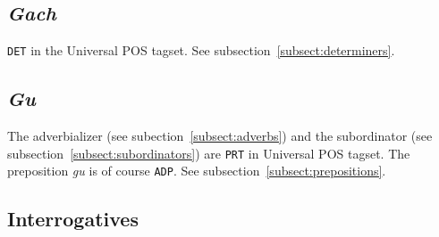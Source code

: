 \documentclass[a4paper]{article}
\begin{document}
\subsection{\textit{Gach}\label{subsect:gach}}

\texttt{DET} in the Universal POS tagset.
See subsection~\ref{subsect:determiners}.

\subsection{\textit{Gu}\label{subsect:gu}}

The adverbializer (see subection~\ref{subsect:adverbs}) and the subordinator (see subsection~\ref{subsect:subordinators}) are \texttt{PRT} in Universal POS tagset.
The preposition \textit{gu} is of course \texttt{ADP}.
See subsection~\ref{subsect:prepositions}.

\subsection{Interrogatives\label{subsect:interrogatives}}
\end{document}
